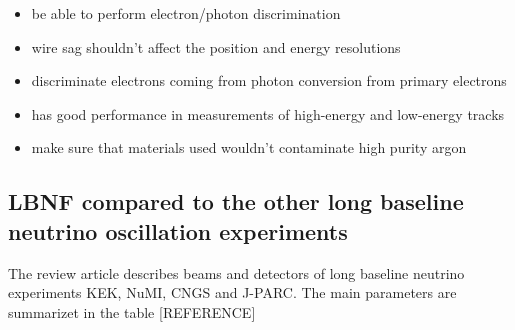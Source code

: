 \begin{itemize}
  \item be able to perform electron/photon discrimination
  \item wire sag shouldn't affect the position and energy resolutions
  \item discriminate electrons coming from photon conversion from primary electrons
  \item has good performance in measurements of high-energy and low-energy tracks
  \item make sure that materials used wouldn't contaminate high purity argon
\end{itemize}



\subsection{LBNF compared to the other long baseline neutrino oscillation experiments}
The review article\cite{ref_LBN_OscExpReview} describes beams and detectors of long baseline neutrino experiments KEK\cite{ref_KEK}, NuMI\cite{ref_NuMI}, CNGS\cite{ref_CNGS} and J-PARC\cite{ref_JPARC}. The main parameters are summarizet in the table [REFERENCE]

